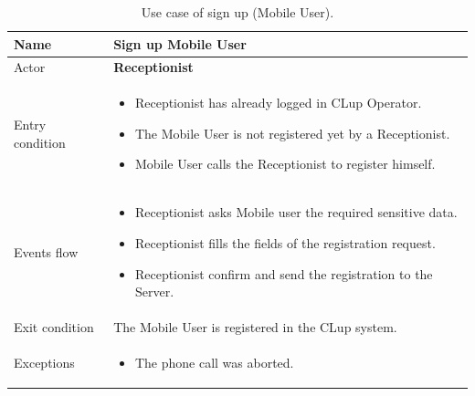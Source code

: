 \bigbreak
 
 \begin{table}[H]\begin{tabular}{|p{5cm} | p{7cm} | }
 	\hline
 	Name & \textbf{Sign up Mobile User}  \\
 	\hline
 	Actor & \textbf{Receptionist}  \\
 	\hline
 	Entry condition &
 	\begin{itemize}
 		\item Receptionist has already logged in CLup Operator. 
 		\item The Mobile User is not registered yet by a Receptionist.
        \item Mobile User calls the Receptionist to register himself.
 	\end{itemize} \\
 	\hline
 	Events flow & 
 	\begin{itemize}
 		\item Receptionist asks Mobile user the required sensitive data.
 		\item Receptionist fills the fields of the registration request.
 		\item Receptionist confirm and send the registration to the Server.
 	\end{itemize} \\
 	\hline
 	Exit condition &
 	The Mobile User is registered in the CLup system. \\
 	\hline 
 	Exceptions & 
 	\begin{itemize}
 		\item The phone call was aborted.
 	\end{itemize} \\
 	\hline
 \end{tabular}
\caption{Use case of sign up (Mobile User).}
 \end{table}
\bigbreak

